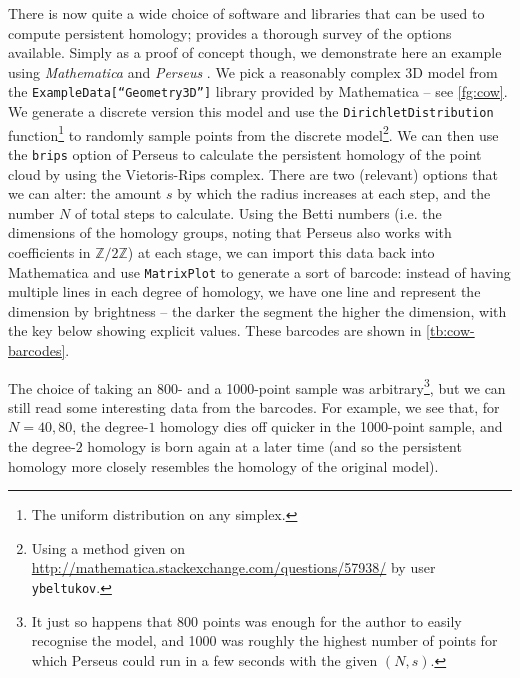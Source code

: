 \documentclass[12pt]{article}
\numberwithin{equation}{subsection}
\numberwithin{theorem}{subsection}
\numberwithin{lemma}{subsection}
\numberwithin{corollary}{subsection}
\numberwithin{definition}{subsection}
\numberwithin{example}{subsection}
\numberwithin{note}{subsection}
\newcommand{\zz}{\mathbb{Z}}
\begin{document}
        There is now quite a wide choice of software and libraries that can be used to compute persistent homology; \cite{Otter:2015wi} provides a thorough survey of the options available.
        Simply as a proof of concept though, we demonstrate here an example using \emph{Mathematica} \cite{Mathematica:tp} and \emph{Perseus} \cite{Perseus:70k_p2_v}.
        We pick a reasonably complex 3D model from the \texttt{ExampleData[``Geometry3D'']} library provided by Mathematica -- see \cref{fg:cow}.
        We generate a discrete version this model and use the \texttt{DirichletDistribution} function\footnote{
            The uniform distribution on any simplex.
        } to randomly sample points from the discrete model\footnote{
            Using a method given on \url{http://mathematica.stackexchange.com/questions/57938/} by user \texttt{ybeltukov}.
        }.
        We can then use the \texttt{brips} option of Perseus to calculate the persistent homology of the point cloud by using the Vietoris-Rips complex.
        There are two (relevant) options that we can alter: the amount $s$ by which the radius increases at each step, and the number $N$ of total steps to calculate.
        Using the Betti numbers (i.e. the dimensions of the homology groups, noting that Perseus also works with coefficients in $\zz/2\zz$) at each stage, we can import this data back into Mathematica and use \texttt{MatrixPlot} to generate a sort of barcode: instead of having multiple lines in each degree of homology, we have one line and represent the dimension by brightness -- the darker the segment the higher the dimension, with the key below showing explicit values.
        These barcodes are shown in \cref{tb:cow-barcodes}.

        The choice of taking an 800- and a 1000-point sample was arbitrary\footnote{
            It just so happens that 800 points was enough for the author to easily recognise the model, and 1000 was roughly the highest number of points for which Perseus could run in a few seconds with the given $(N,s)$.
        }, but we can still read some interesting data from the barcodes.
        For example, we see that, for $N=40,80$, the degree-$1$ homology dies off quicker in the 1000-point sample, and the degree-$2$ homology is born again at a later time (and so the persistent homology more closely resembles the homology of the original model).
\end{document}
